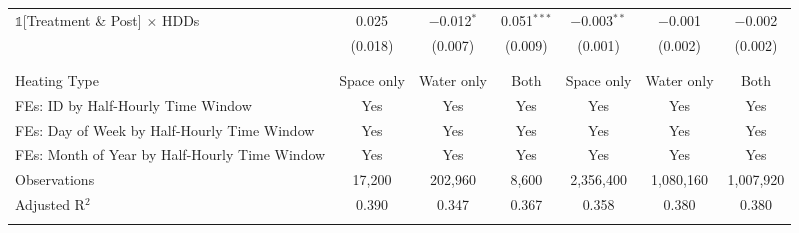 \begin{table}[!htbp]
\begin{tabular}{@{\extracolsep{20pt}}lcccccc}
 $\mathbb{1}$[Treatment \& Post] $\times$ HDDs & 0.025 & $-$0.012$^{*}$ & 0.051$^{***}$ & $-$0.003$^{**}$ & $-$0.001 & $-$0.002 \\ 
  & (0.018) & (0.007) & (0.009) & (0.001) & (0.002) & (0.002) \\ 
  & & & & & & \\ 
\hline \\[-1.8ex] 
Heating Type & Space only & Water only & Both & Space only & Water only & Both \\ 
FEs: ID by Half-Hourly Time Window & Yes & Yes & Yes & Yes & Yes & Yes \\ 
FEs: Day of Week by Half-Hourly Time Window & Yes & Yes & Yes & Yes & Yes & Yes \\ 
FEs: Month of Year by Half-Hourly Time Window & Yes & Yes & Yes & Yes & Yes & Yes \\ 
Observations & 17,200 & 202,960 & 8,600 & 2,356,400 & 1,080,160 & 1,007,920 \\ 
Adjusted R$^{2}$ & 0.390 & 0.347 & 0.367 & 0.358 & 0.380 & 0.380 \\ 
\hline 
\hline \\[-1.8ex] 
\end{tabular} 
\end{table} 
